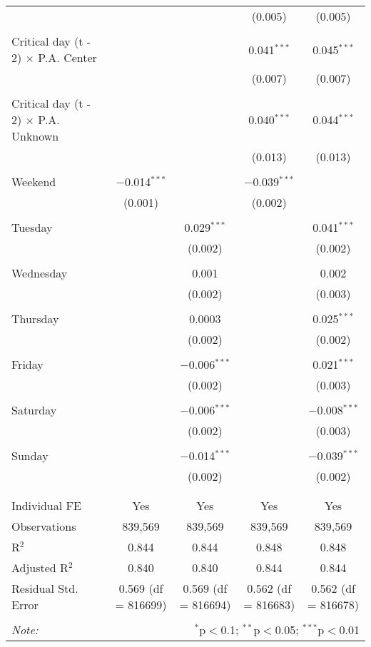 \documentclass[
]{article}
\begin{document}
\begin{table}[!htbp]
{\begin{tabular}{@{\extracolsep{5pt}}lcccc}
  &  &  & (0.005) & (0.005) \\ 
  & & & & \\ 
 Critical day (t - 2) $\times$ P.A. Center &  &  & 0.041$^{***}$ & 0.045$^{***}$ \\ 
  &  &  & (0.007) & (0.007) \\ 
  & & & & \\ 
 Critical day (t - 2) $\times$ P.A. Unknown &  &  & 0.040$^{***}$ & 0.044$^{***}$ \\ 
  &  &  & (0.013) & (0.013) \\ 
  & & & & \\ 
 Weekend & $-$0.014$^{***}$ &  & $-$0.039$^{***}$ &  \\ 
  & (0.001) &  & (0.002) &  \\ 
  & & & & \\ 
 Tuesday &  & 0.029$^{***}$ &  & 0.041$^{***}$ \\ 
  &  & (0.002) &  & (0.002) \\ 
  & & & & \\ 
 Wednesday &  & 0.001 &  & 0.002 \\ 
  &  & (0.002) &  & (0.003) \\ 
  & & & & \\ 
 Thursday &  & 0.0003 &  & 0.025$^{***}$ \\ 
  &  & (0.002) &  & (0.002) \\ 
  & & & & \\ 
 Friday &  & $-$0.006$^{***}$ &  & 0.021$^{***}$ \\ 
  &  & (0.002) &  & (0.003) \\ 
  & & & & \\ 
 Saturday &  & $-$0.006$^{***}$ &  & $-$0.008$^{***}$ \\ 
  &  & (0.002) &  & (0.003) \\ 
  & & & & \\ 
 Sunday &  & $-$0.014$^{***}$ &  & $-$0.039$^{***}$ \\ 
  &  & (0.002) &  & (0.002) \\ 
  & & & & \\ 
\hline \\[-1.8ex] 
Individual FE & Yes & Yes & Yes & Yes \\ 
Observations & 839,569 & 839,569 & 839,569 & 839,569 \\ 
R$^{2}$ & 0.844 & 0.844 & 0.848 & 0.848 \\ 
Adjusted R$^{2}$ & 0.840 & 0.840 & 0.844 & 0.844 \\ 
Residual Std. Error & 0.569 (df = 816699) & 0.569 (df = 816694) & 0.562 (df = 816683) & 0.562 (df = 816678) \\ 
\hline 
\hline \\[-1.8ex] 
\textit{Note:}  & \multicolumn{4}{r}{$^{*}$p$<$0.1; $^{**}$p$<$0.05; $^{***}$p$<$0.01} \\ 
\end{tabular}
} 
\end{table} 
\newpage
\end{document}

